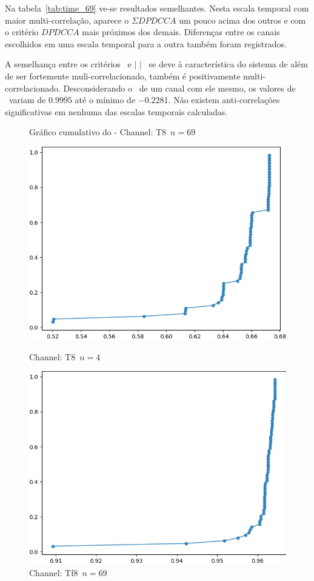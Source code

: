   Na tabela~\ref{tab:time_69} ve-se resultados semelhantes. Nesta escala temporal com maior multi-correlação, aparece o $\Sigma DPDCCA$ um pouco acima dos outros e com o critério $DPDCCA$ mais próximos dos demais. Diferenças entre os canais escolhidos em uma escala temporal para a outra também foram registrados.

  A semelhança entre os critérios \pdcca~e $|$ \pdcca $|$~ se deve à característica do sistema de além de ser fortemente muli-correlacionado, também é positivamente multi-correlacionado. Desconsiderando o \pdcca~de um canal com ele mesmo, os valores de \pdcca~variam de $0.9995$ até o mínimo de $-0.2281$. Não existem anti-correlações significativas em nenhuma das escalas temporais calculadas.
  
  \begin{figure}[ht]
  \caption{Gráfico cumulativo do \dmc - Channel: T8~$n = 69$}
  \begin{minipage}[b]{0.45\textwidth}
    \includegraphics[width=\textwidth]{../Figures/test_dmc/pdcca_of_T8.._n_4.png}
    \caption{Channel: T8~$n = 4$}
  \end{minipage}
  \hfill
  \begin{minipage}[b]{0.45\textwidth}
    \includegraphics[width=\textwidth]{../Figures/test_dmc/pdcca_of_T8.._n_69.png}
    \caption{Channel: Tf8~$n = 69$}
  \end{minipage}
\end{figure}

